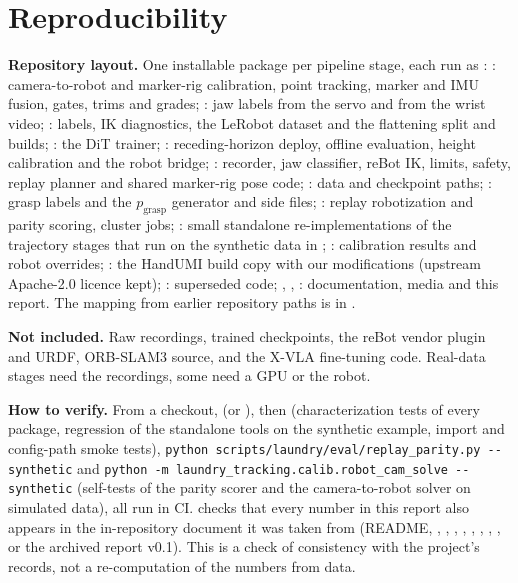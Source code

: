 \documentclass[conference,10pt]{IEEEtran}
\begin{document}
\section{Reproducibility}\label{sec:repro}
\textbf{Repository layout.} One installable package per pipeline stage, each run as
: : camera-to-robot and marker-rig calibration, point
tracking, marker and IMU fusion, gates, trims and grades; : jaw labels from the servo and from the
wrist video; : labels, IK diagnostics, the LeRobot dataset and the flattening split and
builds; : the DiT trainer; : receding-horizon deploy, offline
evaluation, height calibration and the robot bridge; : recorder, jaw classifier, reBot IK,
limits, safety, replay planner and shared marker-rig pose code; : data and checkpoint paths;
: grasp labels and the $p_\mathrm{grasp}$ generator and side files; : replay robotization and parity scoring, cluster jobs;
: small standalone re-implementations of the trajectory stages that run on the synthetic
data in ; : calibration results and robot overrides;
: the HandUMI build copy with our modifications (upstream Apache-2.0 licence kept);
: superseded code; , , : documentation, media and this report. The
mapping from earlier repository paths is in .

\textbf{Not included.} Raw recordings, trained checkpoints, the reBot vendor plugin and URDF, ORB-SLAM3 source, and the
X-VLA fine-tuning code. Real-data stages need the recordings, some need a GPU or the robot.

\textbf{How to verify.} From a checkout,  (or ), then 
(characterization tests of every package, regression of the standalone tools on the synthetic example, import and
config-path smoke tests), \texttt{python scripts/laundry/eval/replay\_parity.py -\/-synthetic} and
\texttt{python -m laundry\_tracking.calib.robot\_cam\_solve -\/-synthetic}
(self-tests of the parity scorer and the camera-to-robot solver on simulated data), all run in CI.  checks that every number in this report also appears in the in-repository
document it was taken from (README, , , , , , , , ,  or
the archived report v0.1). This is a check of consistency with the project's records, not a re-computation of the
numbers from data.
\end{document}
